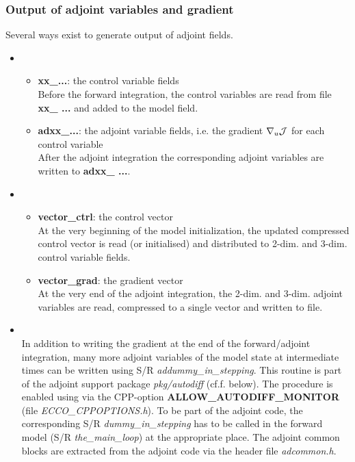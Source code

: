 \subsubsection{Output of adjoint variables and gradient}
%
Several ways exist to generate output of adjoint fields.
%
\begin{itemize}
%
\item 
{}
\\
\begin{itemize}
%
\item {\bf xx\_...}: the control variable fields \\
Before the forward integration, the control
variables are read from file {\bf xx\_ ...} and added to
the model field.
%
\item {\bf adxx\_...}: the adjoint variable fields, i.e. the gradient
$ \nabla _{u}{\cal J} $ for each control variable \\
After the adjoint integration the corresponding adjoint
variables are written to {\bf adxx\_ ...}.
%
\end{itemize}
%
\item 
{}
\\
%
\begin{itemize}
%
\item {\bf vector\_ctrl}: the control vector \\
At the very beginning of the model initialization,
the updated compressed control vector is read (or initialised)
and distributed to 2-dim. and 3-dim. control variable fields.
%
\item {\bf vector\_grad}: the gradient vector \\
At the very end of the adjoint integration,
the 2-dim. and 3-dim. adjoint variables are read,
compressed to a single vector and written to file.
%
\end{itemize}
%
\item 
{}
\\
In addition to writing the gradient at the end of the
forward/adjoint integration, many more adjoint variables
of the model state
at intermediate times can be written using S/R 
{\it addummy\_in\_stepping}.
This routine is part of the adjoint support package 
{\it pkg/autodiff} (cf.f. below).
The procedure is enabled using via the CPP-option
{\bf ALLOW\_AUTODIFF\_MONITOR} (file {\it ECCO\_CPPOPTIONS.h}).
To be part of the adjoint code, the corresponding S/R
{\it dummy\_in\_stepping} has to be called in the forward
model (S/R {\it the\_main\_loop}) at the appropriate place.
The adjoint common blocks are extracted from the adjoint code
via the header file {\it adcommon.h}.


\end{itemize}
